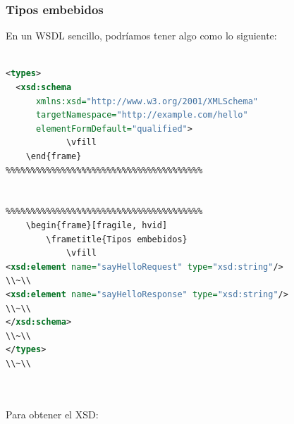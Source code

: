 \documentclass[t,24pt,aspectratio=169]{beamer}
\begin{document}
	\begin{frame}
		\frametitle{Tipos embebidos}
			\vfill
En un WSDL sencillo, podríamos tener algo como lo siguiente:
\\~\\

\begin{lstlisting}[language = xml]
<types>
  <xsd:schema
      xmlns:xsd="http://www.w3.org/2001/XMLSchema"
      targetNamespace="http://example.com/hello"
      elementFormDefault="qualified">
			\vfill
	\end{frame}
%%%%%%%%%%%%%%%%%%%%%%%%%%%%%%%%%%%%%%%


%%%%%%%%%%%%%%%%%%%%%%%%%%%%%%%%%%%%%%%
	\begin{frame}[fragile, hvid]
		\frametitle{Tipos embebidos}
			\vfill
<xsd:element name="sayHelloRequest" type="xsd:string"/>
\\~\\
<xsd:element name="sayHelloResponse" type="xsd:string"/>
\\~\\
</xsd:schema>
\\~\\
</types>
\\~\\

\end{lstlisting}

\\~\\
Para obtener el XSD:
\\~\\
			\vfill
	\end{frame}
\end{document}
